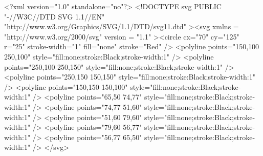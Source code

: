 <?xml version="1.0" standalone="no"?> <!DOCTYPE svg PUBLIC "-//W3C//DTD SVG 1.1//EN" "http://www.w3.org/Graphics/SVG/1.1/DTD/svg11.dtd" ><svg xmlns = "http://www.w3.org/2000/svg" version = "1.1" ><circle cx="70" cy="125" r="25" stroke-width="1" fill="none" stroke="Red" />
<polyline points="150,100 250,100" style="fill:none;stroke:Black;stroke-width:1" />
<polyline points="250,100 250,150" style="fill:none;stroke:Black;stroke-width:1" />
<polyline points="250,150 150,150" style="fill:none;stroke:Black;stroke-width:1" />
<polyline points="150,150 150,100" style="fill:none;stroke:Black;stroke-width:1" />
<polyline points="65,50 74,77" style="fill:none;stroke:Black;stroke-width:1" />
<polyline points="74,77 51,60" style="fill:none;stroke:Black;stroke-width:1" />
<polyline points="51,60 79,60" style="fill:none;stroke:Black;stroke-width:1" />
<polyline points="79,60 56,77" style="fill:none;stroke:Black;stroke-width:1" />
<polyline points="56,77 65,50" style="fill:none;stroke:Black;stroke-width:1" />
</svg>